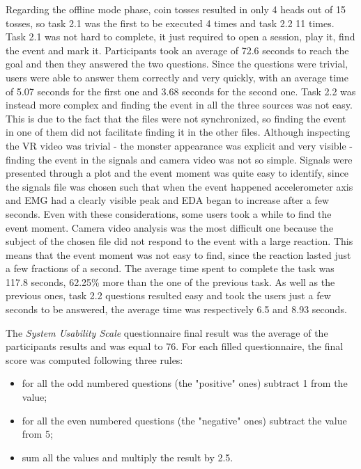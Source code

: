 \documentclass[binding=0.6cm,LaM]{sapthesis}
\begin{document}
Regarding the offline mode phase, coin tosses resulted in only 4 heads out of 15 tosses, so task 2.1 was the first to be executed 4 times and task 2.2 11 times. Task 2.1 was not hard to complete, it just required to open a session, play it, find the event and mark it. Participants took an average of 72.6 seconds to reach the goal and then they answered the two questions. Since the questions were trivial, users were able to answer them correctly and very quickly, with an average time of 5.07 seconds for the first one and 3.68 seconds for the second one.
Task 2.2 was instead more complex and finding the event in all the three sources was not easy. This is due to the fact that the files were not synchronized, so finding the event in one of them did not facilitate finding it in the other files. Although inspecting the VR video was trivial - the monster appearance was explicit and very visible - finding the event in the signals and camera video was not so simple. Signals were presented through a plot and the event moment was quite easy to identify, since the signals file was chosen such that when the event happened accelerometer axis and EMG had a clearly visible peak and EDA began to increase after a few seconds. Even with these considerations, some users took a while to find the event moment. Camera video analysis was the most difficult one because the subject of the chosen file did not respond to the event with a large reaction. This means that the event moment was not easy to find, since the reaction lasted just a few fractions of a second. The average time spent to complete the task was 117.8 seconds, 62.25\% more than the one of the previous task.
As well as the previous ones, task 2.2 questions resulted easy and took the users just a few seconds to be answered, the average time was respectively 6.5 and 8.93 seconds.

The \textit{System Usability Scale} questionnaire final result was the average of the participants results and was equal to 76. For each filled questionnaire, the final score was computed following three rules: 
\begin{itemize}
\item for all the odd numbered questions (the "positive" ones) subtract 1 from the value;
\item for all the even numbered questions (the "negative" ones) subtract the value from 5;
\item sum all the values and multiply the result by 2.5.
\end{itemize}
\end{document}
